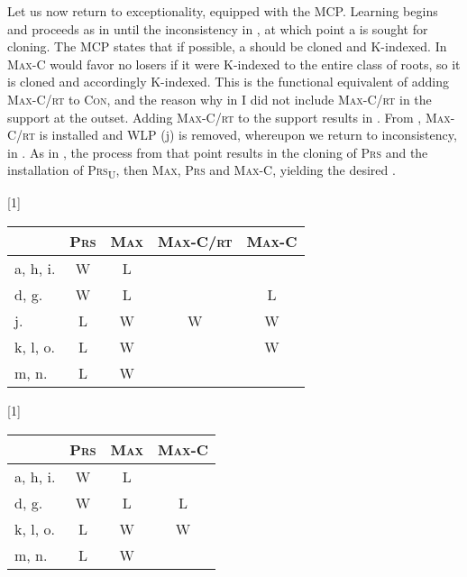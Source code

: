 \documentclass[output=paper,
modfonts
]{LSP/langsci}
\begin{document}
Let us now return to  exceptionality, equipped with the MCP. Learning begins and proceeds as in  until the inconsistency in , at which point a  is sought for cloning. The MCP states that if possible, a  should be cloned and K-indexed. In  \textsc{Max}{}-C would favor no losers if it were K-indexed to the entire class of roots, so it is cloned and accordingly K-indexed. This is the functional equivalent of adding \textsc{Max}{}-C/\textsc{rt} to \textsc{Con,} and\textsc{} the reason why in  I did not include \textsc{Max}{}-C/\textsc{rt} in the support at the outset. Adding \textsc{Max-C/rt} to the support results in . From , \textsc{Max-C/rt} is installed and WLP (j) is removed, whereupon we return to inconsistency, in . As in , the process from that point results in the cloning of \textsc{Prs} and the installation of \textsc{Prs}\textsc{\textsubscript{U}}, then \textsc{Max}, \textsc{Prs} and \textsc{Max-C,} yielding the desired   .\textsc{} 


\ea \label{ex:round:42} 
\renewcommand*\arraystretch{1.2}
\scalebox{1}[1]{\begin{tabular}[t]{|l|c|c||c|c|}
\firsthline & \textsc{Prs} & \textsc{Max} & \textsc{Max-C/rt} & \textsc{Max-C} \\
\hline
\hline a, h, i. & W & L &  & \\
\hline d, g. & W & L &  & L \\
\hline j. & L & W & W & W\\
\hline k, l, o. & L & W & & W \\
\hline m, n. &  L & W & & \\
\hline \end{tabular}} \renewcommand*\arraystretch{1}
\z

\ea \label{ex:round:43} 
\renewcommand*\arraystretch{1.2}
\scalebox{1}[1]{\begin{tabular}[t]{|l|c||c|c|}
\firsthline & \textsc{Prs} & \textsc{Max} & \textsc{Max-C} \\
\hline
\hline a, h, i. & W & L  & \\
\hline d, g. & W & L & L \\
\hline k, l, o. & L & W & W \\
\hline m, n. &  L & W &  \\
\hline \end{tabular}} \renewcommand*\arraystretch{1}
\z
\end{document}
